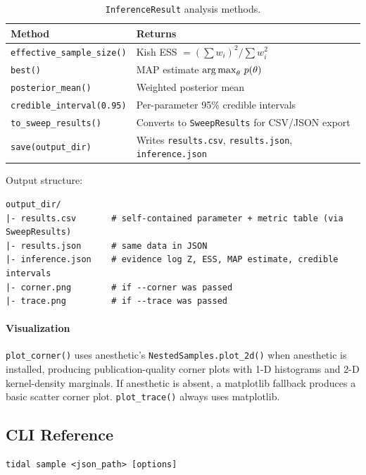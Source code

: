 \begin{table}[htbp]
\centering
\caption{\texttt{InferenceResult} analysis methods.}
\label{tab:inference-methods}
\begin{tabular}{@{}ll@{}}
\toprule
Method & Returns \\
\midrule
\texttt{effective\_sample\_size()} & Kish ESS $= (\sum w_i)^2 / \sum w_i^2$ \\
\texttt{best()}                    & MAP estimate $\operatorname*{arg\,max}_\theta\, p(\theta)$ \\
\texttt{posterior\_mean()}         & Weighted posterior mean \\
\texttt{credible\_interval(0.95)}  & Per-parameter 95\% credible intervals \\
\texttt{to\_sweep\_results()}      & Converts to \texttt{SweepResults} for CSV/JSON export \\
\texttt{save(output\_dir)}         & Writes \texttt{results.csv}, \texttt{results.json}, \texttt{inference.json} \\
\bottomrule
\end{tabular}
\end{table}

Output structure:

\begin{lstlisting}
output_dir/
|- results.csv       # self-contained parameter + metric table (via SweepResults)
|- results.json      # same data in JSON
|- inference.json    # evidence log Z, ESS, MAP estimate, credible intervals
|- corner.png        # if --corner was passed
|- trace.png         # if --trace was passed
\end{lstlisting}

\paragraph{Visualization}
\texttt{plot\_corner()} uses anesthetic's \texttt{NestedSamples.plot\_2d()} when
anesthetic is installed, producing publication-quality corner plots with
1-D histograms and 2-D kernel-density marginals.  If anesthetic is absent,
a matplotlib fallback produces a basic scatter corner plot.
\texttt{plot\_trace()} always uses matplotlib.

\subsection{CLI Reference}
\label{sec:inference-cli}

\begin{lstlisting}[style=bash]
tidal sample <json_path> [options]
\end{lstlisting}

